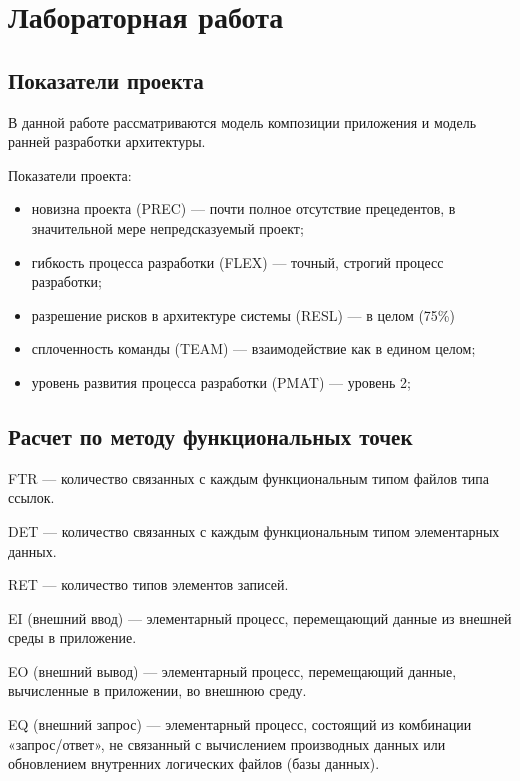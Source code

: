 \chapter{Лабораторная работа}


\section{Показатели проекта}

В данной работе рассматриваются модель композиции приложения и модель ранней разработки архитектуры. 

Показатели проекта:
\begin{itemize}[label = ---]
    \item новизна проекта (PREC) --- почти полное отсутствие прецедентов, в значительной мере непредсказуемый проект;
    \item гибкость процесса разработки (FLEX) --- точный, строгий процесс разработки;
    \item разрешение рисков в архитектуре системы (RESL) --- в целом (75\%)
    \item сплоченность команды (TEAM) --- взаимодействие как в едином целом;
    \item уровень развития процесса разработки (PMAT) --- уровень 2;
\end{itemize}

\section{Расчет по методу функциональных точек}

FTR --- количество связанных с каждым функциональным типом файлов типа ссылок.

DET --- количество связанных с каждым функциональным типом элементарных данных.

RET --- количество типов элементов записей.

EI (внешний ввод) --- элементарный процесс, перемещающий данные из внешней среды в приложение.

EO (внешний вывод) --- элементарный процесс, перемещающий данные, вычисленные в приложении, во внешнюю среду.

EQ (внешний запрос) --- элементарный процесс, состоящий из комбинации «запрос/ответ», не связанный с вычислением производных данных или обновлением внутренних логических файлов (базы данных).

